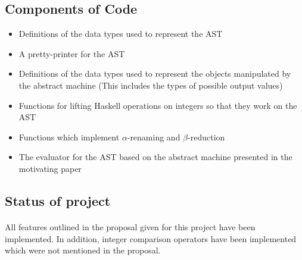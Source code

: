 \documentclass{article}
\begin{document}
\subsection*{Components of Code}

\begin{itemize}
\item Definitions of the data types used to represent the AST
\item A pretty-printer for the AST
\item Definitions of the data types used to represent the objects manipulated by the abstract machine (This includes the types of possible output values)
\item Functions for lifting Haskell operations on integers so that they work on the AST
\item Functions which implement $\alpha$-renaming and $\beta$-reduction
\item The evaluator for the AST based on the abstract machine presented in the motivating paper
\end{itemize}

\subsection*{Status of project}

\paragraph{}
All features outlined in the proposal given for this project have been implemented. In addition, integer comparison operators have been implemented which were not mentioned in the proposal.
\end{document}
